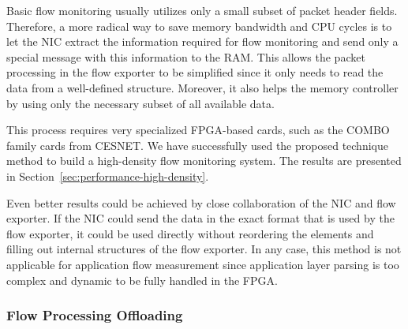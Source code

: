 Basic flow monitoring usually utilizes only a small subset of packet header fields. Therefore, a more radical way to save memory bandwidth and CPU cycles is to let the NIC extract the information required for flow monitoring and send only a special message with this information to the RAM. This allows the packet processing in the flow exporter to be simplified since it only needs to read the data from a well-defined structure. Moreover, it also helps the memory controller by using only the necessary subset of all available data.

This process requires very specialized FPGA-based cards, such as the COMBO family cards from CESNET. We have successfully used the proposed technique method to build a high-density flow monitoring system. The results are presented in Section~\ref{sec:performance-high-density}.

Even better results could be achieved by close collaboration of the NIC and flow exporter. If the NIC could send the data in the exact format that is used by the flow exporter, it could be used directly without reordering the elements and filling out internal structures of the flow exporter. In any case, this method is not applicable for application flow measurement since application layer parsing is too complex and dynamic to be fully handled in the FPGA.

\subsubsection{Flow Processing Offloading}

